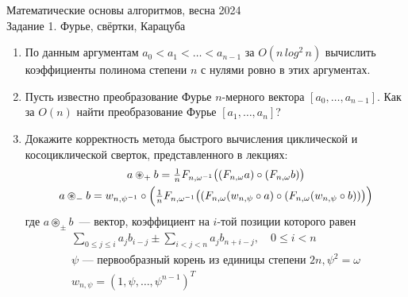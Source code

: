\documentclass[11pt]{article}
\newenvironment{exercise}{\item}{}
\newcommand{\w}{\omega}
\newcommand{\bigpa}[1]{\bigl(#1\bigr)}
\newcommand{\Bigpa}[1]{\Bigl(#1\Bigr)}
\begin{document}
\begin{center}
	\Large Математические основы алгоритмов, весна 2024 \\
	\Large Задание 1. Фурье, свёртки, Карацуба
\end{center}


\begin{enumerate}

\begin{exercise}
По данным аргументам $a_0 < a_1 < \ldots < a_{n-1}$
за $O(n\, log^2\, n)$ вычислить коэффициенты полинома степени $n$ с нулями ровно в этих аргументах.
\end{exercise}

\begin{exercise}
Пусть известно преобразование Фурье \(n\)-мерного вектора \([a_0, \ldots, a_{n-1}]\).
Как за \(O(n)\) найти преобразование Фурье \([a_1, \ldots, a_n]\)?
\end{exercise}

\begin{exercise}
Докажите корректность метода быстрого вычисления циклической и косоциклической сверток,
представленного в лекциях:
%
\begin{gather*}
\textstyle a \circledast_+ b = \frac{1}{n} F_{n,\w^{-1}}\bigpa{(F_{n,\w}a)\circ (F_{n,\w}b)}\\
%
\textstyle a \circledast_- b = w_{n,\psi^{-1}} \circ 
\Bigpa{\frac{1}{n} F_{n,\w^{-1}}\bigpa{
  (F_{n,\w} (w_{n,\psi} \circ a)\circ (F_{n,\w} (w_{n,\psi} \circ b))}}
\end{gather*}
%
где \(a \circledast_{\pm} b\)~— вектор, коэффициент на \(i\)-той позиции которого равен
%
\begin{gather*}
  \sum_{0 \leq j \leq i} a_j b_{i-j} \pm 
  \sum_{i < j < n} a_j b_{n+i-j},\quad 0 \leq i < n\\
\text{$\psi$ --- первообразный корень из единицы степени $2n$},
\psi^2 = \w\\
w_{n,\psi} = (1,\psi,\ldots,\psi^{n-1})^T
\end{gather*}
\end{exercise}


\end{enumerate}
\end{document}

